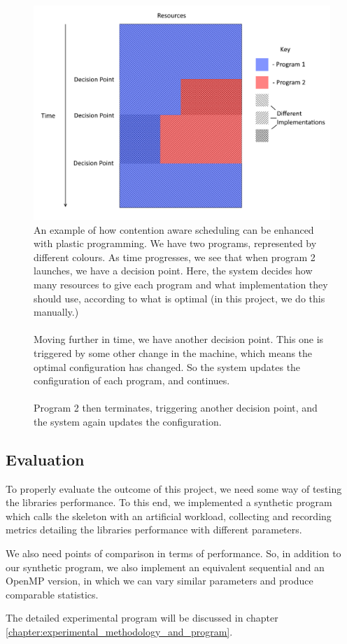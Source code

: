 \begin{figure}
	\centering
	\includegraphics[width=\textwidth]{graphics/plastic_contention_aware_scheduling.png}
	\caption{An example of how contention aware scheduling can be enhanced with plastic programming. We have two programs, represented by different colours. As time progresses, we see that when program 2 launches, we have a decision point. Here, the system decides how many resources to give each program and what implementation they should use, according to what is optimal (in this project, we do this manually.) \\ \\ Moving further in time, we have another decision point. This one is triggered by some other change in the machine, which means the optimal configuration has changed. So the system updates the configuration of each program, and continues. \\ \\ Program 2 then terminates, triggering another decision point, and the system again updates the configuration.}
	\label{fig:plastic_contention_aware_scheduling}
\end{figure}



\subsection{Evaluation}

To properly evaluate the outcome of this project, we need some way of testing the libraries performance. To this end, we implemented a synthetic program which calls the skeleton with an artificial workload, collecting and recording metrics detailing the libraries performance with different parameters.  

We also need points of comparison in terms of performance. So, in addition to our synthetic program, we also implement an equivalent sequential and an OpenMP version, in which we can vary similar parameters and produce comparable statistics. 

The detailed experimental program will be discussed in chapter \ref{chapter:experimental_methodology_and_program}.